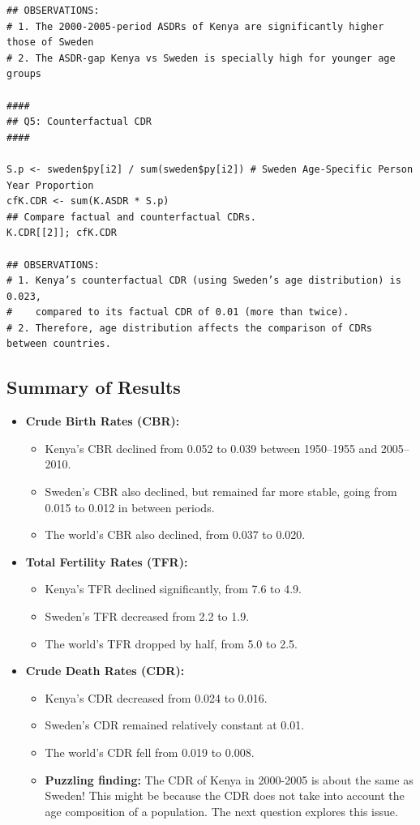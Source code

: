 \documentclass[12pt]{article}
\begin{document}
{\begin{verbatim}
## OBSERVATIONS:
# 1. The 2000-2005-period ASDRs of Kenya are significantly higher those of Sweden
# 2. The ASDR-gap Kenya vs Sweden is specially high for younger age groups

####
## Q5: Counterfactual CDR
####

S.p <- sweden$py[i2] / sum(sweden$py[i2]) # Sweden Age-Specific Person Year Proportion
cfK.CDR <- sum(K.ASDR * S.p)
## Compare factual and counterfactual CDRs.
K.CDR[[2]]; cfK.CDR

## OBSERVATIONS:
# 1. Kenya’s counterfactual CDR (using Sweden’s age distribution) is 0.023, 
#    compared to its factual CDR of 0.01 (more than twice). 
# 2. Therefore, age distribution affects the comparison of CDRs between countries.
\end{verbatim}

\subsection*{Summary of Results}
\begin{itemize}
    \item \textbf{Crude Birth Rates (CBR):} 
    \begin{itemize}
        \item Kenya’s CBR declined from 0.052 to 0.039 between 1950–1955 and 2005–2010.
        \item Sweden’s CBR also declined, but remained far more stable, going from 0.015 to 0.012 in between periods.
        \item The world’s CBR also declined, from 0.037 to 0.020.
    \end{itemize}

    \item \textbf{Total Fertility Rates (TFR):}
    \begin{itemize}
        \item Kenya’s TFR declined significantly, from 7.6 to 4.9.
        \item Sweden’s TFR decreased from 2.2 to 1.9.
        \item The world’s TFR dropped by half, from 5.0 to 2.5.
    \end{itemize}

    \item \textbf{Crude Death Rates (CDR):}
    \begin{itemize}
        \item Kenya’s CDR decreased from 0.024 to 0.016.
        \item Sweden’s CDR remained relatively constant at 0.01.
        \item The world’s CDR fell from 0.019 to 0.008.
        \item \textbf{Puzzling finding:} The CDR of Kenya in 2000-2005 is about the same as Sweden! This might be because the CDR does not take into account the age composition of a population. The next question explores this issue.
    \end{itemize}


\end{itemize}}
\end{document}
